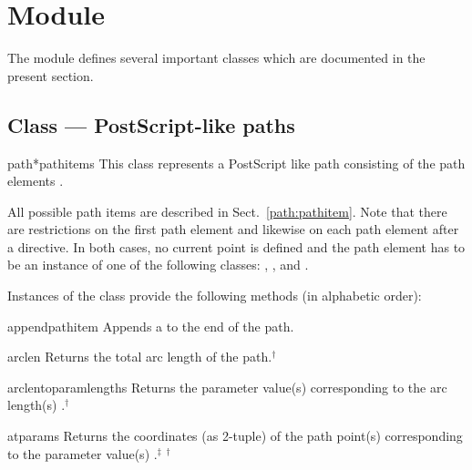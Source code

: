 \section{Module }


\label{path}

The  module defines several important classes which are
documented in the present section.

\subsection{Class  --- PostScript-like paths}

\label{path:path}


\begin{classdesc}{path}{*pathitems}
This class represents a PostScript like path consisting of the
path elements .

All possible path items are described in Sect.~\ref{path:pathitem}.
Note that there are restrictions on the first path element and likewise
on each path element after a  directive. In both cases,
no current point is defined and the path element has to be an instance
of one of the following classes: , , and
.
\end{classdesc}

Instances of the class  provide the following
methods (in alphabetic order):

\begin{methoddesc}{append}{pathitem}
Appends a  to the end of the path.
\end{methoddesc}

\begin{methoddesc}{arclen}{}
Returns the total arc length of the path.$^\dagger$
\end{methoddesc}

\begin{methoddesc}{arclentoparam}{lengths}
  Returns the parameter value(s) corresponding to the arc length(s)
  .$^\dagger$
\end{methoddesc}

\begin{methoddesc}{at}{params}
  Returns the coordinates (as 2-tuple) of the path point(s)
  corresponding to the parameter value(s) .$^\ddagger$
  $^\dagger$
\end{methoddesc}

